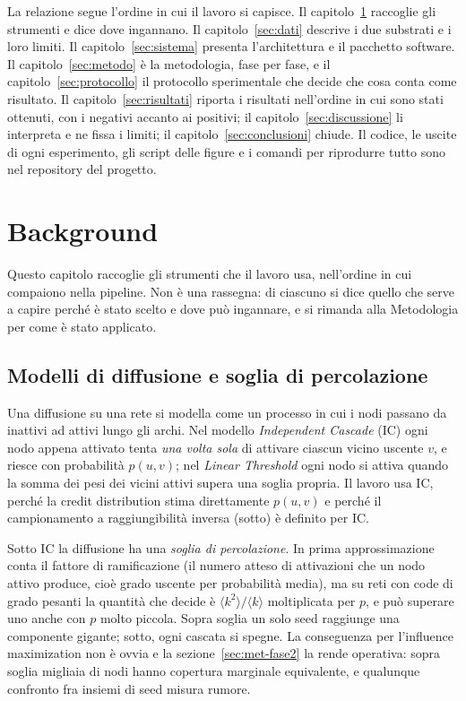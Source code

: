 \documentclass[11pt,a4paper]{article}
\begin{document}
La relazione segue l'ordine in cui il lavoro si capisce. Il capitolo~\ref{sec:background} raccoglie gli strumenti e dice dove ingannano. Il capitolo~\ref{sec:dati} descrive i due substrati e i loro limiti. Il capitolo~\ref{sec:sistema} presenta l'architettura e il pacchetto software. Il capitolo~\ref{sec:metodo} è la metodologia, fase per fase, e il capitolo~\ref{sec:protocollo} il protocollo sperimentale che decide che cosa conta come risultato. Il capitolo~\ref{sec:risultati} riporta i risultati nell'ordine in cui sono stati ottenuti, con i negativi accanto ai positivi; il capitolo~\ref{sec:discussione} li interpreta e ne fissa i limiti; il capitolo~\ref{sec:conclusioni} chiude. Il codice, le uscite di ogni esperimento, gli script delle figure e i comandi per riprodurre tutto sono nel repository del progetto.

\clearpage
\section{Background}
\label{sec:background}

Questo capitolo raccoglie gli strumenti che il lavoro usa, nell'ordine in cui compaiono nella pipeline. Non è una rassegna: di ciascuno si dice quello che serve a capire perché è stato scelto e dove può ingannare, e si rimanda alla Metodologia per come è stato applicato.

\subsection{Modelli di diffusione e soglia di percolazione}
Una diffusione su una rete si modella come un processo in cui i nodi passano da inattivi ad attivi lungo gli archi. Nel modello \emph{Independent Cascade} (IC) \citep{kempe2003} ogni nodo appena attivato tenta \emph{una volta sola} di attivare ciascun vicino uscente $v$, e riesce con probabilità $p(u,v)$; nel \emph{Linear Threshold} ogni nodo si attiva quando la somma dei pesi dei vicini attivi supera una soglia propria. Il lavoro usa IC, perché la credit distribution stima direttamente $p(u,v)$ e perché il campionamento a raggiungibilità inversa (sotto) è definito per IC.

Sotto IC la diffusione ha una \emph{soglia di percolazione}. In prima approssimazione conta il fattore di ramificazione (il numero atteso di attivazioni che un nodo attivo produce, cioè grado uscente per probabilità media), ma su reti con code di grado pesanti la quantità che decide è $\langle k^2 \rangle / \langle k \rangle$ moltiplicata per $p$, e può superare uno anche con $p$ molto piccola. Sopra soglia un solo seed raggiunge una componente gigante; sotto, ogni cascata si spegne. La conseguenza per l'influence maximization non è ovvia e la sezione~\ref{sec:met-fase2} la rende operativa: sopra soglia migliaia di nodi hanno copertura marginale equivalente, e qualunque confronto fra insiemi di seed misura rumore.
\end{document}
